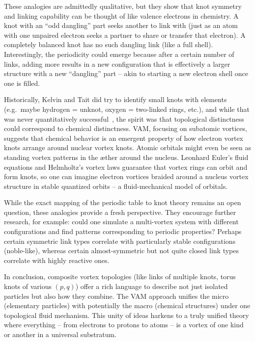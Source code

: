 These analogies are admittedly qualitative, but they show that knot symmetry and linking capability can be thought of like valence electrons in chemistry. A knot with an ``odd dangling'' part seeks another to link with (just as an atom with one unpaired electron seeks a partner to share or transfer that electron). A completely balanced knot has no such dangling link (like a full shell). Interestingly, the periodicity could emerge because after a certain number of links, adding more results in a new configuration that is effectively a larger structure with a new ``dangling'' part -- akin to starting a new electron shell once one is filled.

Historically, Kelvin and Tait did try to identify small knots with elements (e.g.\ maybe hydrogen = unknot, oxygen = two-linked rings, etc.), and while that was never quantitatively successful~\cite{kelvin1867}, the spirit was that topological distinctness could correspond to chemical distinctness. VAM, focusing on subatomic vortices, suggests that chemical behavior is an emergent property of how electron vortex knots arrange around nuclear vortex knots. Atomic orbitals might even be seen as standing vortex patterns in the æther around the nucleus. Leonhard Euler's fluid equations and Helmholtz's vortex laws guarantee that vortex rings can orbit and form knots, so one can imagine electron vortices braided around a nucleus vortex structure in stable quantized orbits -- a fluid-mechanical model of orbitals.

While the exact mapping of the periodic table to knot theory remains an open question, these analogies provide a fresh perspective. They encourage further research, for example: could one simulate a multi-vortex system with different configurations and find patterns corresponding to periodic properties? Perhaps certain symmetric link types correlate with particularly stable configurations (noble-like), whereas certain almost-symmetric but not quite closed link types correlate with highly reactive ones.

In conclusion, composite vortex topologies (like links of multiple knots, torus knots of various $(p,q)$) offer a rich language to describe not just isolated particles but also how they combine. The VAM approach unifies the micro (elementary particles) with potentially the macro (chemical structures) under one topological fluid mechanism. This unity of ideas harkens to a truly unified theory where everything -- from electrons to protons to atoms -- is a vortex of one kind or another in a universal substratum.
